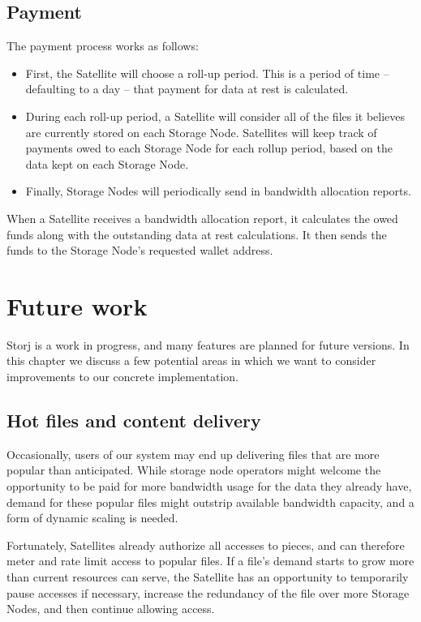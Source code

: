 \documentclass[8pt,fleqn,openany]{book}
\begin{document}
\section{Payment}

The payment process works as follows:

\begin{itemize}
\item First, the Satellite will choose a roll-up period. This is a period of
  time -- defaulting to a day -- that payment for data at rest is calculated.
\item During each roll-up period, a Satellite will consider all of the files it
  believes are currently stored on each Storage Node. Satellites will keep track
of payments owed to each Storage Node for each rollup period, based on
the data kept on each Storage Node.
\item Finally, Storage Nodes will periodically send in bandwidth allocation reports.
\end{itemize}

When a
  Satellite receives a bandwidth allocation report, it calculates the owed
  funds along with the outstanding data at rest calculations. It then sends the
  funds to the Storage Node's requested wallet address.

\chapter{Future work}\label{chap:future-work}

Storj is a work in progress, and many features are planned for future
versions. In this chapter we discuss a few potential areas in which we want to
consider improvements to our concrete implementation.

\section{Hot files and content delivery}\label{sec:future-hot-files}

Occasionally, users of our system may end up delivering files that are more
popular than anticipated. While storage node operators might welcome the
opportunity to be paid for more bandwidth usage for the data they already have,
demand for these popular files might outstrip available bandwidth capacity,
and a form of dynamic scaling is needed.

Fortunately, Satellites already authorize all accesses to pieces, and
can therefore meter and rate limit access to popular
files. If a file's demand starts to grow more than current resources can serve,
the Satellite has an opportunity to temporarily pause accesses if necessary,
increase the redundancy of the file over more Storage Nodes, and then continue
allowing access.
\end{document}
